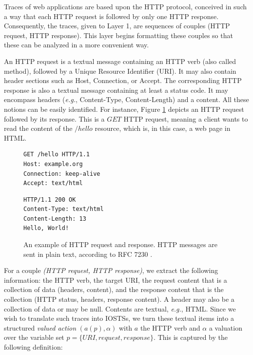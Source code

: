 Traces of web applications are based upon the HTTP protocol,
conceived in such a way that each HTTP request is followed by
only one HTTP response. Consequently, the traces, given to Layer
1, are sequences of couples (HTTP request, HTTP response). This
layer begins formatting these couples so that these can be
analyzed in a more convenient way.

An HTTP request is a textual message containing an HTTP verb
(also called method), followed by a Unique Resource Identifier
(URI). It may also contain header sections such as Host,
Connection, or Accept. The corresponding HTTP response is also a
textual message containing at least a status code. It may
encompass headers (\emph{e.g.},  Content-Type, Content-Length) and a
content. All these notions can be easily identified. For
instance, Figure \ref{fig:httpexample} depicts an HTTP request
followed by its response. This is a $GET$ HTTP request, meaning a
client wants to read the content of the $/hello$ resource, which
is, in this case, a web page in HTML.

\begin{figure}[ht]
\begin{framed}
\begin{BVerbatim}
GET /hello HTTP/1.1
Host: example.org
Connection: keep-alive
Accept: text/html
\end{BVerbatim}
\end{framed}

\begin{framed}
\begin{BVerbatim}
HTTP/1.1 200 OK
Content-Type: text/html
Content-Length: 13
Hello, World!
\end{BVerbatim}
\end{framed}

    \caption{An example of HTTP request and response. HTTP messages
    are sent in plain text, according to RFC 7230 \cite{RFC7230}.}
    \label{fig:httpexample}
\end{figure}

For a couple \textit{(HTTP request, HTTP response)}, we extract
the following information: the HTTP verb, the target URI, the
request content that is a collection of data (headers, content),
and the response content that is the collection (HTTP status,
headers, response content). A header may also be a collection of
data or may be null. Contents are textual, \emph{e.g.}, HTML.
Since we wish to translate such traces into IOSTSs, we turn these
textual items into a structured \emph{valued action}
$(a(p),\alpha)$ with $a$ the HTTP verb and $\alpha$ a valuation
over the variable set $p=\{URI,request,response\}$. This is
captured by the following definition:

